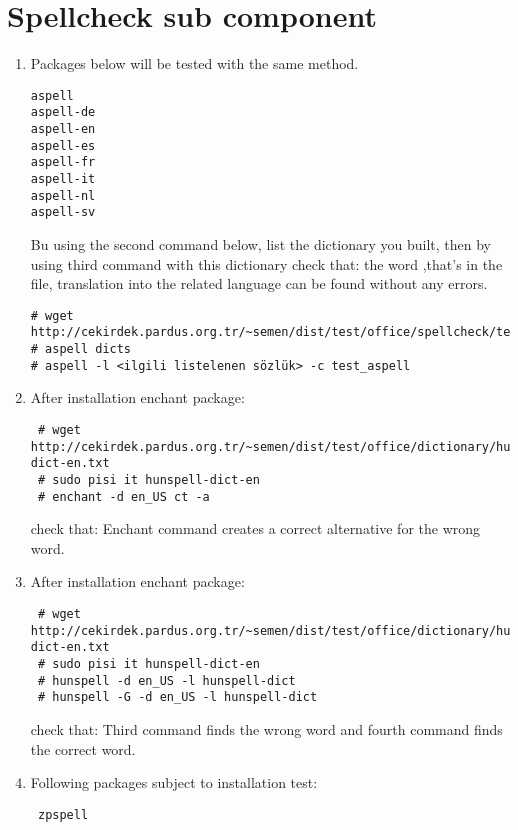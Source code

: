 \documentclass[a4paper,10pt]{article}
\begin{document}
\section{ Spellcheck sub component}
\begin{enumerate}
\item Packages below will be tested with the same method.
\begin{verbatim}
aspell
aspell-de
aspell-en
aspell-es
aspell-fr
aspell-it
aspell-nl
aspell-sv 
\end{verbatim}

Bu using the second command below, list the dictionary you built, then by using third command with this dictionary check that: the word ,that's in the file, translation  into the related language can be found without any errors.
\begin{verbatim}
# wget http://cekirdek.pardus.org.tr/~semen/dist/test/office/spellcheck/test_aspell
# aspell dicts
# aspell -l <ilgili listelenen sözlük> -c test_aspell
\end{verbatim}
\item After installation enchant package:
\begin{verbatim}
 # wget http://cekirdek.pardus.org.tr/~semen/dist/test/office/dictionary/hunspell-dict-en.txt
 # sudo pisi it hunspell-dict-en
 # enchant -d en_US ct -a
\end{verbatim}
check that: Enchant command creates a correct alternative for the wrong word.

\item After installation enchant package:
\begin{verbatim}
 # wget http://cekirdek.pardus.org.tr/~semen/dist/test/office/dictionary/hunspell-dict-en.txt
 # sudo pisi it hunspell-dict-en
 # hunspell -d en_US -l hunspell-dict
 # hunspell -G -d en_US -l hunspell-dict
\end{verbatim}
check that: Third command finds the wrong word and fourth command finds the correct word.

\item Following packages subject to installation test:
\begin{verbatim}
 zpspell
\end{verbatim}
\end{enumerate}
\end{document}
